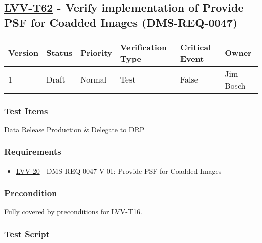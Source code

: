 \hypertarget{lvv-t62---verify-implementation-of-provide-psf-for-coadded-images-dms-req-0047}{%
\subsection{\texorpdfstring{\href{https://jira.lsstcorp.org/secure/Tests.jspa\#/testCase/LVV-T62}{LVV-T62}
- Verify implementation of Provide PSF for Coadded Images
(DMS-REQ-0047)}{LVV-T62 - Verify implementation of Provide PSF for Coadded Images (DMS-REQ-0047)}}\label{lvv-t62---verify-implementation-of-provide-psf-for-coadded-images-dms-req-0047}}

\begin{longtable}[]{@{}llllll@{}}
\toprule
Version & Status & Priority & Verification Type & Critical Event &
Owner\tabularnewline
\midrule
\endhead
1 & Draft & Normal & Test & False & Jim Bosch\tabularnewline
\bottomrule
\end{longtable}

\hypertarget{test-items-151}{%
\subsubsection{Test Items}\label{test-items-151}}

Data Release Production \& Delegate to DRP

\hypertarget{requirements-152}{%
\subsubsection{Requirements}\label{requirements-152}}

\begin{itemize}
\tightlist
\item
  \href{https://jira.lsstcorp.org/browse/LVV-20}{LVV-20} -
  DMS-REQ-0047-V-01: Provide PSF for Coadded Images
\end{itemize}

\hypertarget{precondition-2}{%
\subsubsection{Precondition}\label{precondition-2}}

Fully covered by preconditions for
\href{https://jira.lsstcorp.org/secure/Tests.jspa\#/testCase/LVV-T16}{LVV-T16}.

\hypertarget{test-script-152}{%
\subsubsection{Test Script}\label{test-script-152}}

